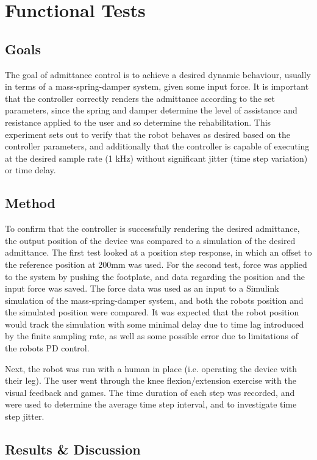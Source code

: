 \documentclass[12pt]{report}
\begin{document}
	\section{Functional Tests}

	\subsection{Goals}
	
	The goal of admittance control is to achieve a desired dynamic behaviour, usually in terms of a mass-spring-damper system, given some input force. It is important that the controller correctly renders the admittance according to the set parameters, since the spring and damper determine the level of assistance and resistance applied to the user and so determine the rehabilitation. This experiment sets out to verify that the robot behaves as desired based on the controller parameters, and additionally that the controller is capable of executing at the desired sample rate (1 kHz) without significant jitter (time step variation) or time delay. 
	
	\subsection{Method}

	To confirm that the controller is successfully rendering the desired admittance, the output position of the device was compared to a simulation of the desired admittance. The first test looked at a position step response, in which an offset to the reference position at 200mm was used. For the second test, force was applied to the system by pushing the footplate, and data regarding the position and the input force was saved. The force data was used as an input to a Simulink simulation of the mass-spring-damper system, and both the robots position and the simulated position were compared. It was expected that the robot position would track the simulation with some minimal delay due to time lag introduced by the finite sampling rate, as well as some possible error due to limitations of the robots PD control.	
	
	Next, the robot was run with a human in place (i.e. operating the device with their leg). The user went through the knee flexion/extension exercise with the visual feedback and games. The time duration of each step was recorded, and were used to determine the average time step interval, and to investigate time step jitter.  
	
	\subsection{Results \& Discussion}
	
\end{document}
